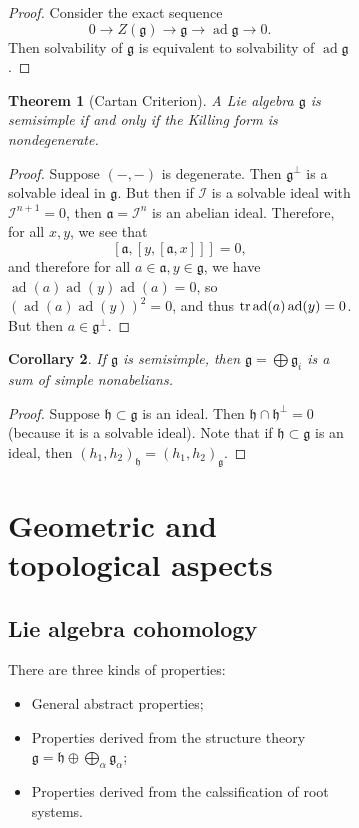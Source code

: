 \documentclass[leqno, openany]{memoir}
\newtheorem{thm}{Theorem}[section]
\newtheorem{cor}[thm]{Corollary}
\theoremstyle{definition}
\theoremstyle{remark}
\theoremstyle{plain}
\theoremstyle{definition}
\theoremstyle{remark}
\newcommand{\mc}[1]{\mathcal{#1}}
\newcommand{\mf}[1]{\mathfrak{#1}}
\DeclareMathOperator{\ad}{ad}
\begin{document}
\begin{figure}[H]
\begin{figure}[H]
\begin{proof} Consider the exact sequence \[ 0 \to Z(\mf{g}) \to \mf{g} \to \ad
\mf{g} \to 0. \] Then solvability of $\mf{g}$ is equivalent to solvability of
$\ad \mf{g}$.  \end{proof}

\begin{thm}[Cartan Criterion] A Lie algebra $\mf{g}$ is semisimple if and only
if the Killing form is nondegenerate.  \end{thm}

\begin{proof} Suppose $(-,-)$ is degenerate. Then $\mf{g}^{\perp}$ is a
    solvable ideal in $\mf{g}$. But then if $\mc{I}$ is a solvable ideal with
    $\mc{I}^{n+1} = 0$, then $\mf{a} = \mc{I}^n$ is an abelian ideal.
    Therefore, for all $x,y$, we see that \[ [\mf{a}, [y,[\mf{a}, x]]] = 0, \]
    and therefore for all $a \in \mf{a}, y \in \mf{g}$, we have $\ad (a) \ad(y)
    \ad(a) = 0$, so ${(\ad(a) \ad(y))}^2 = 0$, and thus $\tr \ad(a) \ad(y) =
    0$. But then $a \in \mf{g}^{\perp}$.  \end{proof}

\begin{cor} If $\mf{g}$ is semisimple, then $\mf{g} = \bigoplus \mf{g}_i$ is a
sum of simple nonabelians.  \end{cor}

\begin{proof} Suppose $\mf{h} \subset \mf{g}$ is an ideal. Then $\mf{h} \cap
\mf{h}^{\perp} = 0$ (because it is a solvable ideal). Note that if $\mf{h}
\subset \mf{g}$ is an ideal, then ${(h_1, h_2)}_{\mf{h}} = {(h_1,
h_2)}_{\mf{g}}$.  \end{proof}

\chapter{Geometric and topological aspects}%

\section{Lie algebra cohomology}%

There are three kinds of properties: \begin{itemize} \item General abstract
    properties; \item Properties derived from the structure theory $\mf{g} =
    \mf{h} \oplus \bigoplus_{\alpha} \mf{g}_{\alpha}$; \item Properties derived
    from the calssification of root systems.  \end{itemize}


\end{figure}
\end{figure}
\end{document}
